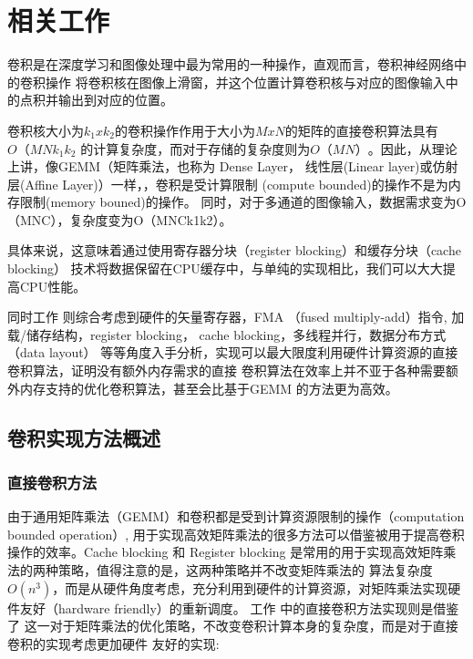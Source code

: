 
\chapter{相关工作}

卷积是在深度学习和图像处理中最为常用的一种操作，直观而言，卷积神经网络中的卷积操作
将卷积核在图像上滑窗，并这个位置计算卷积核与对应的图像输入中的点积并输出到对应的位置。

卷积核大小为$k_1xk_2$的卷积操作作用于大小为$MxN$的矩阵的直接卷积算法具有$O（MNk_1k_2$
的计算复杂度，而对于存储的复杂度则为$O（MN）$。因此，从理论上讲，像GEMM（矩阵乘法，也称为
Dense Layer， 线性层(Linear layer)或仿射层(Affine Layer)）一样，，卷积是受计算限制
(compute bounded)的操作不是为内存限制(memory bouned)的操作。
同时，对于多通道的图像输入，数据需求变为O（MNC），复杂度变为O（MNCk1k2）。

具体来说，这意味着通过使用寄存器分块（register blocking）和缓存分块（cache blocking）
技术将数据保留在CPU缓存中，与单纯的实现相比，我们可以大大提高CPU性能。

同时工作
则综合考虑到硬件的矢量寄存器，FMA （fused multiply-add）指令,
加载/储存结构，register blocking， cache blocking，多线程并行，数据分布方式（data layout）
等等角度入手分析，实现可以最大限度利用硬件计算资源的直接卷积算法，证明没有额外内存需求的直接
卷积算法在效率上并不亚于各种需要额外内存支持的优化卷积算法，甚至会比基于GEMM 的方法更为高效。

\section{卷积实现方法概述}

\subsection{直接卷积方法}

由于通用矩阵乘法（GEMM）和卷积都是受到计算资源限制的操作（computation bounded operation）,
用于实现高效矩阵乘法的很多方法可以借鉴被用于提高卷积操作的效率。Cache blocking 和 Register
blocking 是常用的用于实现高效矩阵乘法的两种策略，值得注意的是，这两种策略并不改变矩阵乘法的
算法复杂度$O(n^3)$，而是从硬件角度考虑，充分利用到硬件的计算资源，对矩阵乘法实现硬件友好（hardware
friendly）的重新调度。 工作
\cite{Georganas2018AnatomyOH}
中的直接卷积方法实现则是借鉴了
这一对于矩阵乘法的优化策略，不改变卷积计算本身的复杂度，而是对于直接卷积的实现考虑更加硬件
友好的实现:


